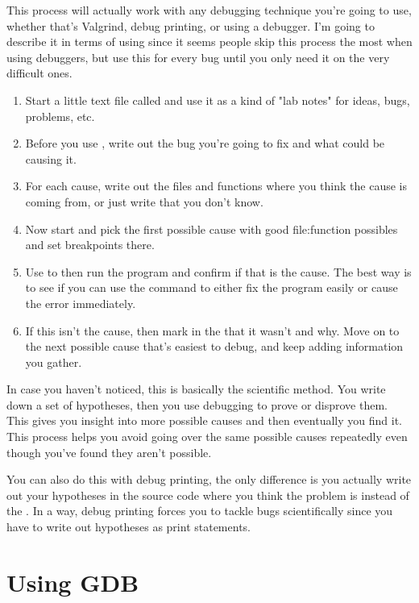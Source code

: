 \begin{enumerate}
This process will actually work with any debugging technique you're going to
use, whether that's Valgrind, debug printing, or using a debugger.  I'm going
to describe it in terms of using  since it seems people skip this
process the most when using debuggers, but use this for every bug until you
only need it on the very difficult ones.

\begin{enumerate}
\item Start a little text file called  and use it as a kind of
    "lab notes" for ideas, bugs, problems, etc.
\item Before you use , write out the bug you're going to fix
    and what could be causing it.
\item For each cause, write out the files and functions where you think 
    the cause is coming from, or just write that you don't know.
\item Now start  and pick the first possible cause with good
    file:function possibles and set breakpoints there.
\item Use  to then run the program and confirm if that is the
    cause.  The best way is to see if you can use the  command
    to either fix the program easily or cause the error immediately.
\item If this isn't the cause, then mark in the  that it
    wasn't and why.  Move on to the next possible cause that's easiest
    to debug, and keep adding information you gather.
\end{enumerate}

In case you haven't noticed, this is basically the scientific method.  You
write down a set of hypotheses, then you use debugging to prove or disprove
them.  This gives you insight into more possible causes and then eventually you
find it. This process helps you avoid going over the same possible causes
repeatedly even though you've found they aren't possible.

You can also do this with debug printing, the only difference is you actually
write out your hypotheses in the source code where you think the problem is
instead of the .  In a way, debug printing forces you to tackle
bugs scientifically since you have to write out hypotheses as print statements.


\section{Using GDB}


\end{enumerate}
